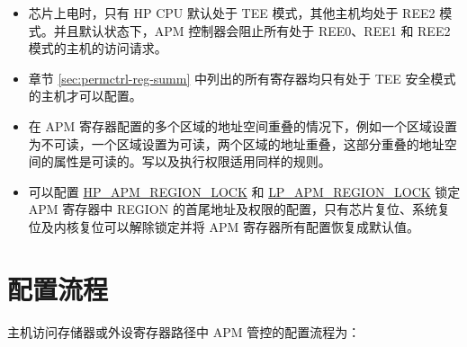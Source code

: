 \documentclass[main\_\_CN.tex]{subfiles}
\begin{document}
\begin{tiplisting}
\vspace{-2em}
\begin{itemize}
    \item 芯片上电时，只有 HP CPU 默认处于 TEE 模式，其他主机均处于 REE2 模式。并且默认状态下，APM 控制器会阻止所有处于 REE0、REE1 和 REE2 模式的主机的访问请求。
    \item 章节 \ref{sec:permctrl-reg-summ}  中列出的所有寄存器均只有处于 TEE 安全模式的主机才可以配置。
    \item 在 APM 寄存器配置的多个区域的地址空间重叠的情况下，例如一个区域设置为不可读，一个区域设置为可读，两个区域的地址重叠，这部分重叠的地址空间的属性是可读的。写以及执行权限适用同样的规则。
    \item 可以配置 \hyperref[fielddesc:HPAPMREGIONNLOCK]{HP\_APM\_REGION\_LOCK} 和 \hyperref[fielddesc:LPAPMREGIONNLOCK]{LP\_APM\_REGION\_LOCK} 锁定 APM 寄存器中 REGION 的首尾地址及权限的配置，只有芯片复位、系统复位及内核复位可以解除锁定并将 APM 寄存器所有配置恢复成默认值。
\end{itemize}
\end{tiplisting}

\section{配置流程}

主机访问存储器或外设寄存器路径中 APM 管控的配置流程为：
\end{document}
